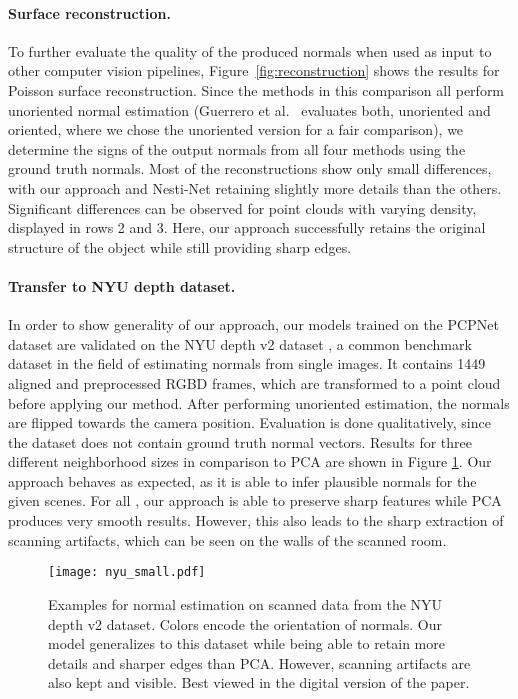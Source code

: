 \documentclass[10pt,twocolumn,letterpaper]{article}
\begin{document}
\paragraph{Surface reconstruction.}
To further evaluate the quality of the produced normals when used
as input to other computer vision pipelines, Figure~\ref{fig:reconstruction}
shows the results for Poisson surface reconstruction. Since the methods in this comparison all perform unoriented normal estimation (Guerrero et al.~\cite{Guerrero:2018} evaluates both, unoriented and oriented, where we chose the unoriented version for a fair comparison), we determine the signs of the output normals from all four methods using the ground truth normals. 
Most of the reconstructions show only small differences, with our
approach and Nesti-Net retaining slightly more details than the others.
Significant differences can be observed for point clouds with varying density,
displayed in rows 2 and 3. Here, our approach successfully retains the 
original structure of the object while still providing sharp edges.


\paragraph{Transfer to NYU depth dataset.} 
In order to show generality of our approach, our models trained on the PCPNet dataset are validated on the NYU depth v2 dataset \cite{Silberman:2012}, a common benchmark dataset in the field of estimating normals from single images. It contains 1449 aligned and preprocessed RGBD frames, which are transformed to a point cloud before applying our method. After performing unoriented estimation, the normals are flipped towards the camera position.
Evaluation is done qualitatively, since the dataset does not contain ground truth normal vectors. 
Results for three different neighborhood sizes in comparison to PCA are shown in Figure \ref{fig:nyu}. Our approach behaves as expected, as it is able to infer plausible normals for the given scenes. For all , our approach is able to preserve sharp features while PCA produces very smooth results. However, this also leads to the sharp extraction of scanning artifacts, which can be seen on the walls of the scanned room.
 \begin{figure}[t]
\centering
  \texttt{[image: nyu\_small.pdf]}
  \caption{Examples for normal estimation on scanned data from the NYU depth v2 dataset. Colors encode the orientation of normals. Our model generalizes to this dataset while being able to retain more details and sharper edges than PCA. However, scanning artifacts are also kept and visible. Best viewed in the digital version of the paper.
  }
  \label{fig:nyu}
\end{figure}
\end{document}
